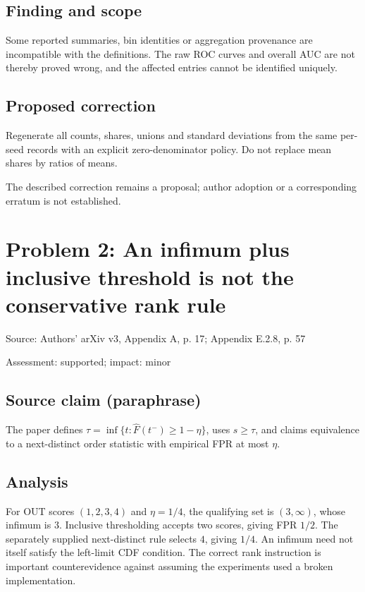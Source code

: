 \documentclass[11pt]{article}
\begin{document}
\subsection*{Finding and scope}

Some reported summaries, bin identities or aggregation provenance are incompatible with the definitions. The raw ROC curves and overall AUC are not thereby proved wrong, and the affected entries cannot be identified uniquely.

\subsection*{Proposed correction}

Regenerate all counts, shares, unions and standard deviations from the same per-seed records with an explicit zero-denominator policy. Do not replace mean shares by ratios of means.

The described correction remains a proposal; author adoption or a corresponding erratum is not established.

\section*{Problem 2: An infimum plus inclusive threshold is not the conservative rank rule}

Source: Authors’ arXiv v3, Appendix A, p. 17; Appendix E.2.8, p. 57

Assessment: supported; impact: minor

\subsection*{Source claim (paraphrase)}

The paper defines \(\tau=\inf\{t:\widehat F(t^-)\ge1-\eta\}\), uses \(s\ge\tau\), and claims equivalence to a next-distinct order statistic with empirical FPR at most \(\eta\).

\subsection*{Analysis}

For OUT scores \((1,2,3,4)\) and \(\eta=1/4\), the qualifying set is \((3,\infty)\), whose infimum is \(3\). Inclusive thresholding accepts two scores, giving FPR \(1/2\). The separately supplied next-distinct rule selects \(4\), giving \(1/4\). An infimum need not itself satisfy the left-limit CDF condition. The correct rank instruction is important counterevidence against assuming the experiments used a broken implementation.
\end{document}
